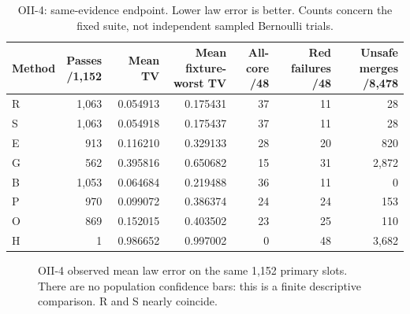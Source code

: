 \begin{table}[tbp]
\centering
\caption{OII-4: same-evidence endpoint. Lower law error is better. Counts concern the fixed suite, not independent sampled Bernoulli trials.}\label{tab:endpoint}
\footnotesize
\setlength{\tabcolsep}{5pt}
\begin{tabular}{lrrrrrr}
\toprule
Method & \shortstack{Passes\\/1,152} & Mean TV & \shortstack{Mean fixture-\\worst TV} & \shortstack{All-core\\/48} & \shortstack{Red failures\\/48} & \shortstack{Unsafe merges\\/8,478} \\
\midrule
R & 1,063 & 0.054913 & 0.175431 & 37 & 11 & 28 \\
S & 1,063 & 0.054918 & 0.175437 & 37 & 11 & 28 \\
E & 913 & 0.116210 & 0.329133 & 28 & 20 & 820 \\
G & 562 & 0.395816 & 0.650682 & 15 & 31 & 2,872 \\
B & 1,053 & 0.064684 & 0.219488 & 36 & 11 & 0 \\
P & 970 & 0.099072 & 0.386374 & 24 & 24 & 153 \\
O & 869 & 0.152015 & 0.403502 & 23 & 25 & 110 \\
H & 1 & 0.986652 & 0.997002 & 0 & 48 & 3,682 \\
\bottomrule
\end{tabular}
\par{}
\end{table}



\begin{figure}[tbp]
\centering
{}
\caption{OII-4 observed mean law error on the same 1,152 primary slots. There are no population confidence bars: this is a finite descriptive comparison. R and S nearly coincide.}
\label{fig:means}
\end{figure}

